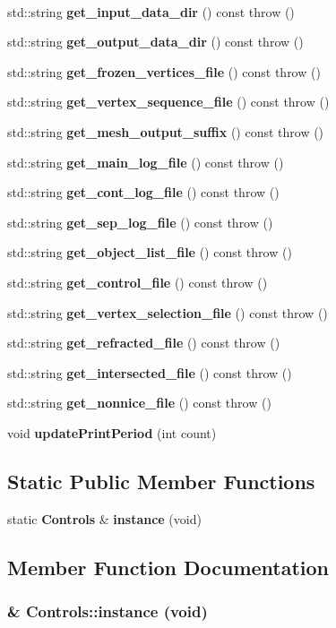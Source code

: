 \begin{CompactItemize}
$$\item 
std::string {\bf get\_\-input\_\-data\_\-dir} () const  throw ()
\item 
std::string {\bf get\_\-output\_\-data\_\-dir} () const  throw ()
\item 
std::string {\bf get\_\-frozen\_\-vertices\_\-file} () const  throw ()
\item 
std::string {\bf get\_\-vertex\_\-sequence\_\-file} () const  throw ()
\item 
std::string {\bf get\_\-mesh\_\-output\_\-suffix} () const  throw ()
\item 
std::string {\bf get\_\-main\_\-log\_\-file} () const  throw ()
\item 
std::string {\bf get\_\-cont\_\-log\_\-file} () const  throw ()
\item 
std::string {\bf get\_\-sep\_\-log\_\-file} () const  throw ()
\item 
std::string {\bf get\_\-object\_\-list\_\-file} () const  throw ()
\item 
std::string {\bf get\_\-control\_\-file} () const  throw ()
\item 
std::string {\bf get\_\-vertex\_\-selection\_\-file} () const  throw ()
\item 
std::string {\bf get\_\-refracted\_\-file} () const  throw ()
\item 
std::string {\bf get\_\-intersected\_\-file} () const  throw ()
\item 
std::string {\bf get\_\-nonnice\_\-file} () const  throw ()
\item 
void {\bf update\-Print\-Period} (int count)
\end{CompactItemize}
\subsection*{Static Public Member Functions}
\begin{CompactItemize}
\item 
static {\bf Controls} \& {\bf instance} (void)
\end{CompactItemize}


\subsection{Member Function Documentation}
\subsubsection{ \& Controls::instance (void)\hspace{0.3cm}{\tt  [static]}}\label{classControls_39f30cbd69ccbf480c976228725e0ed3}


